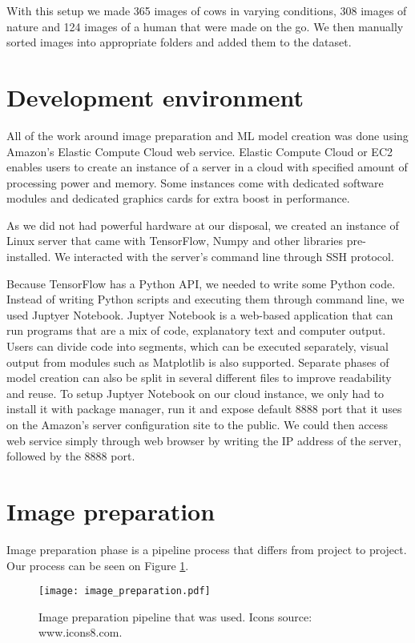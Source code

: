 With this setup we made 365 images of cows in varying conditions, 308 images of nature and 124 images of a human that were made on the go.
We then manually sorted images into appropriate folders and added them to the dataset.


\section{ Development environment}

All of the work around image preparation and ML model creation was done using Amazon's Elastic Compute Cloud web service.
Elastic Compute Cloud or EC2 enables users to create an instance of a server in a cloud with specified amount of processing power and memory.
Some instances come with dedicated software modules and dedicated graphics cards for extra boost in performance.

As we did not had powerful hardware at our disposal, we created an instance of Linux server that came with TensorFlow, Numpy and other libraries pre-installed.
We interacted with the server's command line through SSH protocol.

Because TensorFlow has a Python API, we needed to write some Python code.
Instead of writing Python scripts and executing them through command line, we used Juptyer Notebook. 
Juptyer Notebook is a web-based application that can run programs that are a mix of code, explanatory text and computer output.
Users can divide code into segments, which can be executed separately, visual output from modules such as Matplotlib is also supported.
Separate phases of model creation can also be split in several different files to improve readability and reuse.
To setup Juptyer Notebook on our cloud instance, we only had to install it with package manager, run it and expose default 8888 port that it uses on the Amazon's server configuration site to the public.
We could then access web service simply through web browser by writing the IP address of the server, followed by the 8888 port.


\section{ Image preparation}

Image preparation phase is a pipeline process that differs from project to project.
Our process can be seen on Figure \ref{image_preparation}.

\begin{figure}[ht]
    \centering
    \texttt{[image: image\_preparation.pdf]} 
    \caption{Image preparation pipeline that was used. Icons source: www.icons8.com.}
    \label{image_preparation}
\end{figure}

